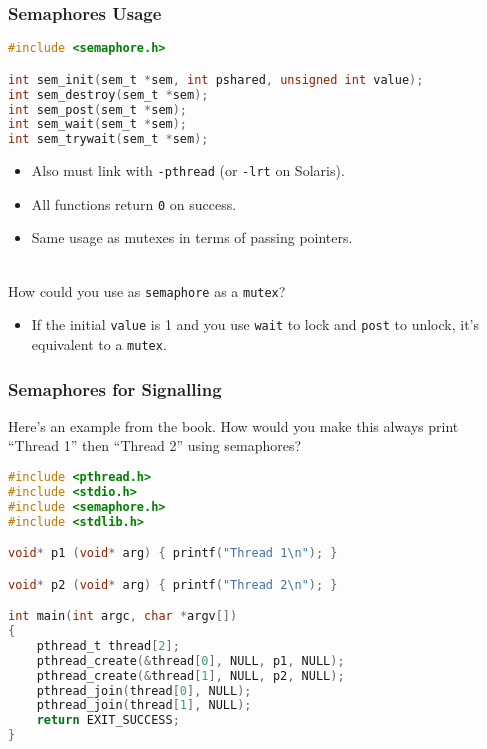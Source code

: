 \begin{frame}[fragile]
  \frametitle{Semaphores Usage}
  

  \begin{lstlisting}[language=C]
#include <semaphore.h>

int sem_init(sem_t *sem, int pshared, unsigned int value);
int sem_destroy(sem_t *sem);
int sem_post(sem_t *sem);
int sem_wait(sem_t *sem);
int sem_trywait(sem_t *sem);
  \end{lstlisting}

  \begin{itemize}
    \item Also must link with {\tt -pthread} (or {\tt -lrt} on Solaris).
    \item All functions return {\tt 0} on success.
    \item Same usage as mutexes in terms of passing pointers.
  \end{itemize}~\\[1em]
    How could you use as {\tt semaphore} as a {\tt mutex}?
    \begin{itemize}
    \item<2-> If the initial {\tt value} is 1 and you use {\tt wait} to lock
      and {\tt post} to unlock, it's equivalent to a {\tt mutex}.
    \end{itemize}


\end{frame}

\begin{frame}[fragile]
  \frametitle{Semaphores for Signalling}


  Here's an example from the book. How would you make this always print
  ``Thread 1'' then ``Thread 2'' using semaphores?

  \begin{lstlisting}[language=C]
#include <pthread.h>
#include <stdio.h>
#include <semaphore.h>
#include <stdlib.h>

void* p1 (void* arg) { printf("Thread 1\n"); }

void* p2 (void* arg) { printf("Thread 2\n"); }

int main(int argc, char *argv[])
{
    pthread_t thread[2];
    pthread_create(&thread[0], NULL, p1, NULL);
    pthread_create(&thread[1], NULL, p2, NULL);
    pthread_join(thread[0], NULL);
    pthread_join(thread[1], NULL);
    return EXIT_SUCCESS;
}
  \end{lstlisting}

\end{frame}

